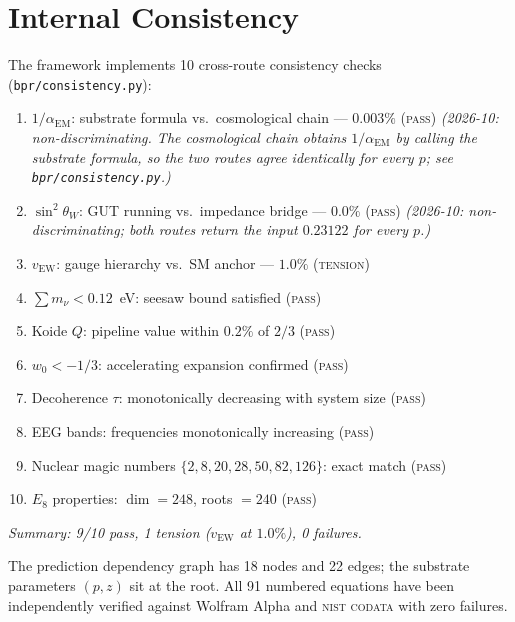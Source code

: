 \documentclass[aps,prd,twocolumn,superscriptaddress,longbibliography,nofootinbib]{revtex4-2}
\newcommand{\vEW}{v_{\mathrm{EW}}}
\newcommand{\sinW}{\sin^2\!\theta_W}
\newcommand{\alphaEM}{\alpha_{\mathrm{EM}}}
\begin{document}
\section{Internal Consistency}
\label{sec:consistency}

The framework implements 10 cross-route consistency checks
(\texttt{bpr/consistency.py}):

\begin{enumerate}
\item $1/\alphaEM$: substrate formula vs.\ cosmological chain --- $0.003\%$
  (\textsc{pass})
  \textit{(2026-10: non-discriminating.  The cosmological chain obtains
  $1/\alphaEM$ by calling the substrate formula, so the two routes agree
  identically for every $p$; see \texttt{bpr/consistency.py}.)}
\item $\sinW$: GUT running vs.\ impedance bridge --- $0.0\%$ (\textsc{pass})
  \textit{(2026-10: non-discriminating; both routes return the input $0.23122$ for every $p$.)}
\item $\vEW$: gauge hierarchy vs.\ SM anchor --- $1.0\%$ (\textsc{tension})
\item $\sum m_\nu < 0.12$~eV: seesaw bound satisfied (\textsc{pass})
\item Koide $Q$: pipeline value within $0.2\%$ of $2/3$ (\textsc{pass})
\item $w_0 < -1/3$: accelerating expansion confirmed (\textsc{pass})
\item Decoherence $\tau$: monotonically decreasing with system size
  (\textsc{pass})
\item EEG bands: frequencies monotonically increasing (\textsc{pass})
\item Nuclear magic numbers $\{2,8,20,28,50,82,126\}$: exact match
  (\textsc{pass})
\item $E_8$ properties: $\dim = 248$, roots $= 240$ (\textsc{pass})
\end{enumerate}

\textit{Summary: 9/10 pass, 1 tension ($\vEW$ at $1.0\%$), 0 failures.}

The prediction dependency graph has 18 nodes and 22 edges; the substrate
parameters $(p, z)$ sit at the root.  All 91 numbered equations have been
independently verified against Wolfram Alpha and \textsc{nist codata}
with zero failures.
\end{document}
